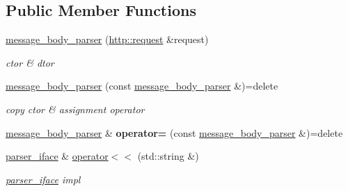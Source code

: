 \subsection*{Public Member Functions}
\begin{DoxyCompactItemize}
\item 
\mbox{\label{classnetflex_1_1parsing_1_1message__body__parser_a04a55d3b4b1dcfac47fd21fe2606da5f}} 
\hyperlink{classnetflex_1_1parsing_1_1message__body__parser_a04a55d3b4b1dcfac47fd21fe2606da5f}{message\+\_\+body\+\_\+parser} (\hyperlink{classnetflex_1_1http_1_1request}{http\+::request} \&request)
\begin{DoxyCompactList}\small\item\em ctor \& dtor \end{DoxyCompactList}\item 
\mbox{\label{classnetflex_1_1parsing_1_1message__body__parser_a0ef5ba4567c214272bf7ff84a98b5447}} 
\hyperlink{classnetflex_1_1parsing_1_1message__body__parser_a0ef5ba4567c214272bf7ff84a98b5447}{message\+\_\+body\+\_\+parser} (const \hyperlink{classnetflex_1_1parsing_1_1message__body__parser}{message\+\_\+body\+\_\+parser} \&)=delete
\begin{DoxyCompactList}\small\item\em copy ctor \& assignment operator \end{DoxyCompactList}\item 
\mbox{\label{classnetflex_1_1parsing_1_1message__body__parser_a0c5708195cecc7688ec3260ed38c5f88}} 
\hyperlink{classnetflex_1_1parsing_1_1message__body__parser}{message\+\_\+body\+\_\+parser} \& {\bfseries operator=} (const \hyperlink{classnetflex_1_1parsing_1_1message__body__parser}{message\+\_\+body\+\_\+parser} \&)=delete
\item 
\mbox{\label{classnetflex_1_1parsing_1_1message__body__parser_adb35dd992073f27e5c85d13453cd3db6}} 
\hyperlink{classnetflex_1_1parsing_1_1parser__iface}{parser\+\_\+iface} \& \hyperlink{classnetflex_1_1parsing_1_1message__body__parser_adb35dd992073f27e5c85d13453cd3db6}{operator$<$$<$} (std\+::string \&)
\begin{DoxyCompactList}\small\item\em \hyperlink{classnetflex_1_1parsing_1_1parser__iface}{parser\+\_\+iface} impl \end{DoxyCompactList}\item 

\end{DoxyCompactItemize}
